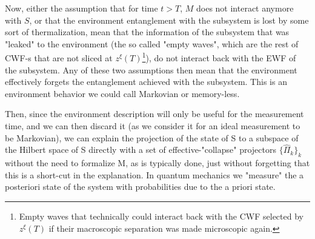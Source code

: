 \documentclass[11pt, a4paper]{article} %
\begin{document}
Now, either the assumption that for time $t>T$, $M$ does not interact anymore with $S$, or that the environment entanglement with the subsystem is lost by some sort of thermalization, mean that the information of the subsystem that was "leaked" to the environment (the so called "empty waves", which are the rest of CWF-s that are not sliced at $z^\xi(T)$\footnote{Empty waves that technically could interact back with the CWF selected by $z^\xi(T)$ if their macroscopic separation was made microscopic again.}), do not interact back with the EWF of the subsystem. Any of these two assumptions then mean that the environment effectively forgets the entanglement achieved with the subsystem. This is an environment behavior we could call Markovian or memory-less.

Then, since the environment description will only be useful for the measurement time, and we can then discard it (as we consider it for an ideal measurement to be Markovian), we can explain the projection of the state of S to a subspace of the Hilbert space of S directly with a set of effective-"collapse" projectors $\{\hat{\Pi}_k\}_k$ without the need to formalize M, as is typically done, just without forgetting that this is a short-cut in the explanation. In quantum mechanics we "measure" the a posteriori state of the system with probabilities due to the a priori state. 
\end{document}
